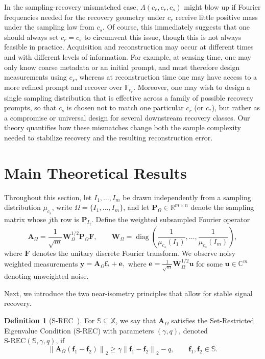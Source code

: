 \documentclass{article}
\theoremstyle{plain}
\theoremstyle{definition}
\newtheorem{definition}[theorem]{Definition}
\theoremstyle{remark}
\begin{document}
In the sampling-recovery mismatched case, $\Lambda(c_r,c_r,c_s)$ might blow up if Fourier frequencies needed for the recovery geometry under $c_r$ receive little positive mass under the sampling law from $c_s$. Of course, this immediately suggests that one should always set $c_r = c_s$ to circumvent this issue, though this is not always feasible in practice. Acquisition and reconstruction may occur at different times and with different levels of information. For example, at sensing time, one may only know coarse metadata or an initial prompt, and must therefore design measurements using $c_s$, whereas at reconstruction time one may have access to a more refined prompt and recover over $\mathbb{F}_{c_r}$. Moreover, one may wish to design a single sampling distribution that is effective across a family of possible recovery prompts, so that $c_s$ is chosen not to match one particular $c_r$ (or $c_*$), but rather as a compromise or universal design for several downstream recovery classes. Our theory quantifies how these mismatches change both the sample complexity needed to stabilize recovery and the resulting reconstruction error.

\section{Main Theoretical Results}\label{sec: theory}
Throughout this section, let $I_1,\dots,I_m$ be drawn independently from a sampling distribution $\mu_{c_s}$, write $\Omega= \{ I_1,\dots,I_m \}$, and let $\mathbf P_\Omega \in \mathbb R^{m\times n}$ denote the sampling matrix whose $j$th row is $\mathbf P_{I_j}$. Define the weighted subsampled Fourier operator
\[
  \mathbf A_\Omega
  =
  \frac{1}{\sqrt{m}} \mathbf W_\Omega^{1/2}\mathbf P_\Omega \mathbf F,
  \qquad
  \mathbf W_\Omega
  =
  \operatorname{diag}\left(
    \frac{1}{\mu_{c_s}(I_1)},
    \dots,
    \frac{1}{\mu_{c_s}(I_m)}
  \right),
\]
where $\mathbf F$ denotes the unitary discrete Fourier transform. We observe noisy weighted measurements
$
  \mathbf y = \mathbf A_\Omega \mathbf f_* + \mathbf e,
$
where $\mathbf e = \frac{1}{\sqrt{m}}\mathbf W_\Omega^{1/2}\mathbf u$ for some
$\mathbf{u}\in\mathbb C^m$ denoting unweighted noise.

Next, we introduce the two near-isometry principles that allow for stable signal recovery. 

\begin{definition}[S-REC~\cite{bora2017compressed}]
  For $\mathbb{S} \subseteq \mathbb X$, we say that $\mathbf{A}_\Omega$ satisfies the Set-Restricted Eigenvalue Condition (S-REC) with parameters $(\gamma, q)$, denoted $\mathrm{S\text{-}REC}\left(\mathbb S,\gamma,q\right)$, if
  \[
    \left\|\mathbf A_\Omega\left(\mathbf f_1-\mathbf f_2\right)\right\|_2
    \geq
    \gamma \left\|\mathbf f_1-\mathbf f_2\right\|_2
    -
    q,
    \qquad
    \mathbf f_1,\mathbf f_2\in\mathbb{S}.
  \]
\end{definition}
\end{document}
